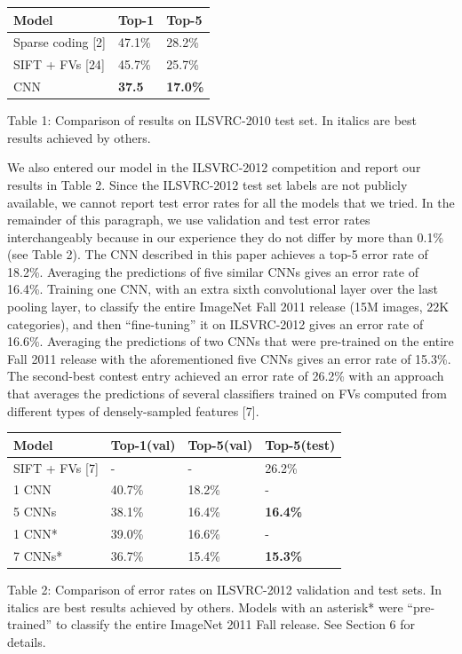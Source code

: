 \documentclass[12pt,a4paper,UTF8,twoside]{book}
\begin{document}
\begin{longtable}[]{@{}lll@{}}
\toprule
\textbf{Model} & \textbf{Top-1} & \textbf{Top-5}\tabularnewline
\midrule
\endhead
Sparse coding {[}2{]} & 47.1\% & 28.2\%\tabularnewline
SIFT + FVs {[}24{]} & 45.7\% & 25.7\%\tabularnewline
CNN & \textbf{37.5} & \textbf{17.0\%}\tabularnewline
\bottomrule
\end{longtable}

Table 1: Comparison of results on ILSVRC-2010 test set. In italics are best results achieved by others.

We also entered our model in the ILSVRC-2012 competition and report our results in Table 2. Since the ILSVRC-2012 test set labels are not publicly available, we cannot report test error rates for all the models that we tried. In the remainder of this paragraph, we use validation and test error rates interchangeably because in our experience they do not differ by more than 0.1\% (see Table 2). The CNN described in this paper achieves a top-5 error rate of 18.2\%. Averaging the predictions of five similar CNNs gives an error rate of 16.4\%. Training one CNN, with an extra sixth convolutional layer over the last pooling layer, to classify the entire ImageNet Fall 2011 release (15M images, 22K categories), and then ``fine-tuning'' it on ILSVRC-2012 gives an error rate of 16.6\%. Averaging the predictions of two CNNs that were pre-trained on the entire Fall 2011 release with the aforementioned five CNNs gives an error rate of 15.3\%. The second-best contest entry achieved an error rate of 26.2\% with an approach that averages the predictions of several classifiers trained on FVs computed from different types of densely-sampled features {[}7{]}.

\begin{longtable}[]{@{}llll@{}}
\toprule
\textbf{Model} & \textbf{Top-1(val)} & \textbf{Top-5(val)} & \textbf{Top-5(test)}\tabularnewline
\midrule
\endhead
SIFT + FVs {[}7{]} & - & - & 26.2\%\tabularnewline
1 CNN & 40.7\% & 18.2\% & -\tabularnewline
5 CNNs & 38.1\% & 16.4\% & \textbf{16.4\%}\tabularnewline
1 CNN* & 39.0\% & 16.6\% & -\tabularnewline
7 CNNs* & 36.7\% & 15.4\% & \textbf{15.3\%}\tabularnewline
\bottomrule
\end{longtable}

Table 2: Comparison of error rates on ILSVRC-2012 validation and test sets. In italics are best results achieved by others. Models with an asterisk* were ``pre-trained'' to classify the entire ImageNet 2011 Fall release. See Section 6 for details.
\end{document}
